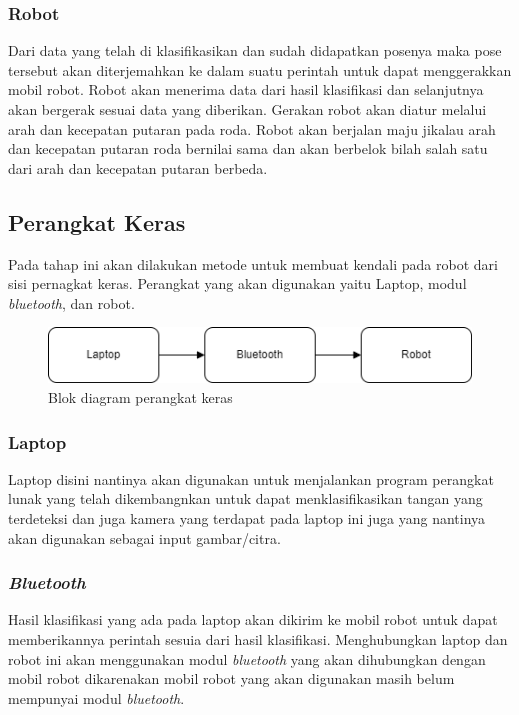 \subsubsection{Robot}
  Dari data yang telah di klasifikasikan dan sudah didapatkan posenya maka pose tersebut akan diterjemahkan ke dalam suatu perintah untuk dapat menggerakkan mobil robot. Robot akan menerima data dari hasil klasifikasi dan selanjutnya akan bergerak sesuai data yang diberikan. Gerakan robot akan diatur melalui arah dan kecepatan putaran pada roda. Robot akan berjalan maju jikalau arah dan kecepatan putaran roda bernilai sama dan akan berbelok bilah salah satu dari arah dan kecepatan putaran berbeda.

\subsection{Perangkat Keras}
Pada tahap ini akan dilakukan metode untuk membuat kendali pada robot dari sisi pernagkat keras. Perangkat yang akan digunakan yaitu Laptop, modul \textit{bluetooth}, dan robot. 
\begin{figure}[!h]
	\centering
	\includegraphics[width=0.7\linewidth]{"gambar/gambar perangkat keras"}
	\caption{Blok diagram perangkat keras}
	\label{fig:gambar33}
\end{figure}

\subsubsection{Laptop}
  Laptop disini nantinya akan digunakan untuk menjalankan program perangkat lunak yang telah dikembangnkan untuk dapat menklasifikasikan tangan yang terdeteksi dan juga kamera yang terdapat pada laptop ini juga yang nantinya akan digunakan sebagai input gambar/citra.

\subsubsection{\textit{Bluetooth}}
  Hasil klasifikasi yang ada pada laptop akan dikirim ke mobil robot untuk dapat memberikannya perintah sesuia dari hasil klasifikasi. Menghubungkan laptop dan robot ini akan menggunakan modul \textit{bluetooth} yang akan dihubungkan dengan mobil robot dikarenakan mobil robot yang akan digunakan masih belum mempunyai modul \textit{bluetooth}. 

